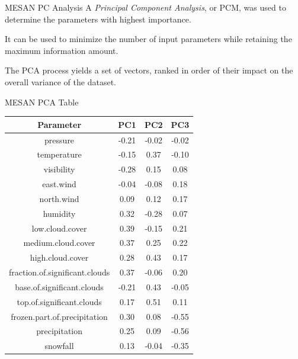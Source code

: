 \documentclass[10pt]{beamer}
\begin{document}
\begin{frame}{MESAN PC Analysis}
A \textit{Principal Component Analysis}, or PCM, was used to determine the parameters with highest importance.
\par
It can be used to minimize the number of input parameters while retaining the maximum information amount.
\par
The PCA process yields a set of vectors, ranked in order of their impact on the overall variance of the dataset.
\end{frame}


\begin{frame}{MESAN PCA Table}
\begin{table}[h]
	\centering
	\begin{tabular}{c|c|c|c}
		\textbf{Parameter} & \textbf{PC1} & \textbf{PC2} & \textbf{PC3} \\
		\hline \hline
		pressure                       & -0.21 & -0.02 & -0.02 \\
		\hline
		temperature                    & -0.15 &  0.37 & -0.10 \\
		\hline
		visibility                     & -0.28 &  0.15 &  0.08 \\
		\hline
		east.wind                      & -0.04 & -0.08 &  0.18 \\
		\hline
		north.wind                     &  0.09 &  0.12 &  0.17 \\
		\hline
		humidity                       &  0.32 & -0.28 &  0.07 \\
		\hline
		low.cloud.cover                &  0.39 & -0.15 &  0.21 \\
		\hline
		medium.cloud.cover             &  0.37 &  0.25 &  0.22 \\
		\hline
		high.cloud.cover               &  0.28 &  0.43 &  0.17 \\
		\hline
		fraction.of.significant.clouds &  0.37 & -0.06 &  0.20 \\
		\hline
		base.of.significant.clouds     & -0.21 &  0.43 & -0.05 \\
		\hline
		top.of.significant.clouds      &  0.17 &  0.51 &  0.11 \\
		\hline
		frozen.part.of.precipitation   &  0.30 &  0.08 & -0.55 \\
		\hline
		precipitation                  &  0.25 &  0.09 & -0.56 \\
		\hline
		snowfall                       &  0.13 & -0.04 & -0.35 \\
	\end{tabular}
	\label{tbl:pcx}
\end{table}
\end{frame}
\end{document}

